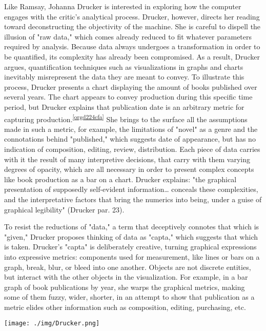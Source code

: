 \documentclass[11pt]{article}
\begin{document}
Like Ramsay, Johanna Drucker is interested in exploring how the
computer engages with the critic's analytical process. Drucker,
however, directs her reading toward deconstructing the objectivity of
the machine. She is careful to dispell the illusion of "raw data,"
which comes already reduced to fit whatever parameters required by
analysis. Because data always undergoes a transformation in order to
be quantified, its complexity has already been compromised. As a
result, Drucker argues, quantification techniques such as
visualizations in graphs and charts inevitably misrepresent the data
they are meant to convey. To illustrate this process, Drucker presents
a chart displaying the amount of books published over several
years. The chart appears to convey production during this specific
time period, but Drucker explains that publication date is an
arbitrary metric for capturing production.\textsuperscript{\ref{orgd224cfa}} She brings to the
surface all the assumptions made in such a metric, for example, the
limitations of "novel" as a genre and the connotations behind
"published," which suggests date of appearance, but has no indication
of composition, editing, review, distribution. Each piece of data
carries with it the result of many interpretive decisions, that carry
with them varying degrees of opacity, which are all necessary in order
to present complex concepts like book production as a bar on a
chart. Drucker explains: "the graphical presentation of supposedly
self-evident information\ldots{} conceals these complexities, and the
interpretative factors that bring the numerics into being, under a
guise of graphical legibility" (Drucker par. 23).

To resist the reductions of "data," a term that deceptively connotes
that which is "given," Drucker proposes thinking of data as "capta,"
which suggests that which is taken. Drucker's "capta" is deliberately
creative, turning graphical expressions into expressive metrics:
components used for measurement, like lines or bars on a graph, break,
blur, or bleed into one another. Objects are not discrete entities,
but interact with the other objects in the visualization. For example,
in a bar graph of book publications by year, she warps the graphical
metrics, making some of them fuzzy, wider, shorter, in an attempt to
show that publication as a metric elides other information such as
composition, editing, purchasing, etc.

\begin{center}
\texttt{[image: ./img/Drucker.png]}
\end{center}
\end{document}
